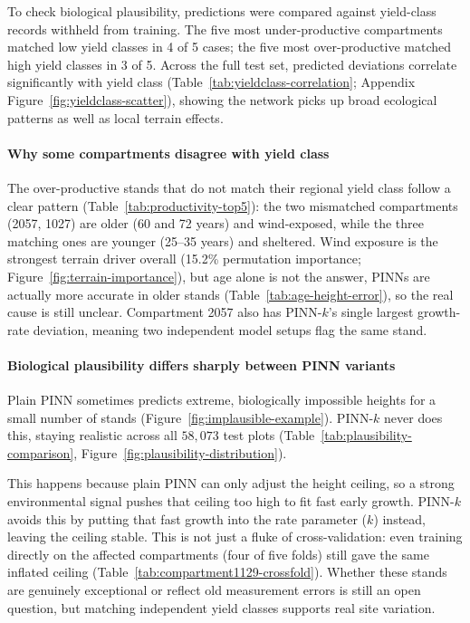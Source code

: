 \documentclass[logo,msc,ai]{infthesis}           %
\begin{document}
To check biological plausibility, predictions were compared against yield-class records withheld from training. The five most under-productive compartments matched low yield classes in 4 of 5 cases; the five most over-productive matched high yield classes in 3 of 5. Across the full test set, predicted deviations correlate significantly with yield class (Table~\ref{tab:yieldclass-correlation}; Appendix Figure~\ref{fig:yieldclass-scatter}), showing the network picks up broad ecological patterns as well as local terrain effects.

\paragraph*{Why some compartments disagree with yield class}
The over-productive stands that do not match their regional yield class follow a clear pattern (Table~\ref{tab:productivity-top5}): the two mismatched compartments (2057, 1027) are older (60 and 72 years) and wind-exposed, while the three matching ones are younger (25--35 years) and sheltered. Wind exposure is the strongest terrain driver overall (15.2\% permutation importance; Figure~\ref{fig:terrain-importance}), but age alone is not the answer, PINNs are actually more accurate in older stands (Table~\ref{tab:age-height-error}), so the real cause is still unclear. Compartment 2057 also has PINN-$k$'s single largest growth-rate deviation, meaning two independent model setups flag the same stand.

\paragraph*{Biological plausibility differs sharply between PINN variants}
Plain PINN sometimes predicts extreme, biologically impossible heights for a small number of stands (Figure~\ref{fig:implausible-example}). PINN-$k$ never does this, staying realistic across all $58{,}073$ test plots (Table~\ref{tab:plausibility-comparison}, Figure~\ref{fig:plausibility-distribution}).

This happens because plain PINN can only adjust the height ceiling, so a strong environmental signal pushes that ceiling too high to fit fast early growth. PINN-$k$ avoids this by putting that fast growth into the rate parameter ($k$) instead, leaving the ceiling stable. This is not just a fluke of cross-validation: even training directly on the affected compartments (four of five folds) still gave the same inflated ceiling (Table~\ref{tab:compartment1129-crossfold}). Whether these stands are genuinely exceptional or reflect old measurement errors is still an open question, but matching independent yield classes supports real site variation.
\end{document}
